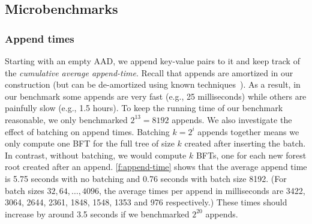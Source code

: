 \subsection{Microbenchmarks}

\subsubsection{Append times}
\label{s:eval:append-time}
% 
%
%
%
%
%
%
%
%

Starting with an empty AAD, we append key-value pairs to it and keep track of the \textit{cumulative average append-time}.
Recall that appends are amortized in our construction (but can be de-amortized using known techniques~\cite{overmars-van-leeuwen,overmars}).
As a result, in our benchmark some appends are very fast (e.g., 25 milliseconds) while others are painfully slow (e.g., 1.5 hours).
To keep the running time of our benchmark reasonable, we only benchmarked $2^{13} = 8192$ appends.
We also investigate the effect of batching on append times.
Batching $k = 2^i$ appends together means we only compute one BFT for the full tree of size $k$ created after inserting the batch.
In contrast, without batching, we would compute $k$ BFTs, one for each new forest root created after an append.
\cref{f:append-time} shows that the average append time is 5.75 seconds with no batching and 0.76 seconds with batch size 8192.
(For batch sizes $32, 64, \dots, 4096$, the average times per append in milliseconds are 3422, 3064, 2644, 2361, 1848, 1548, 1353 and 976 respectively.)
These times should increase by around 3.5 seconds if we benchmarked $2^{20}$ appends.

